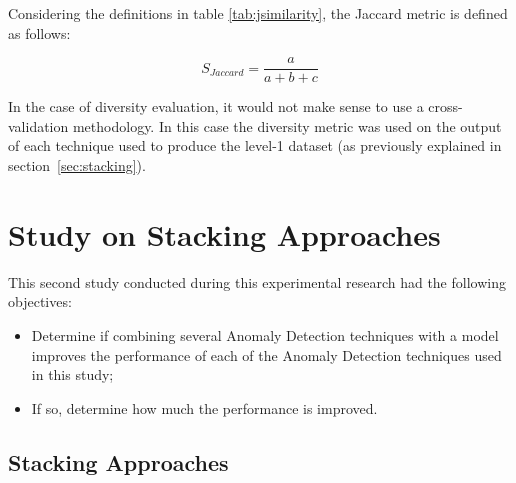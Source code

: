Considering the definitions in table \ref{tab:jsimilarity}, the Jaccard metric is defined as follows:

\begin{equation}
S_{Jaccard} = \frac{a}{a + b + c}
\end{equation}

In the case of diversity evaluation, it would not make sense to use a cross-validation methodology.
In this case the diversity metric was used on the output of each technique used to produce the level-1 dataset (as previously explained in section~\ref{sec:stacking}).

%	
	




\section{Study on Stacking Approaches}

This second study conducted during this experimental research had the following objectives:

\begin{itemize}
	\item Determine if combining several Anomaly Detection techniques with a model improves the performance of each of the Anomaly Detection techniques used in this study;
	
	\item If so, determine how much the performance is improved.
\end{itemize}

\subsection{Stacking Approaches}

